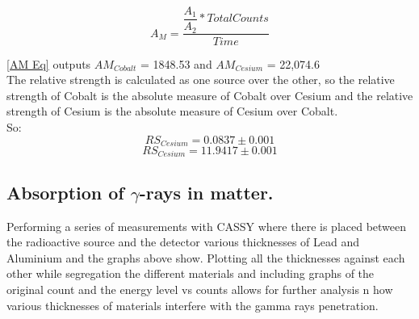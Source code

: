 \documentclass[12pt]{article}
\begin{document}
\begin{equation}
A_M = \dfrac{\dfrac{A_1}{A_2}* Total Counts}{Time}
\label{AM Eq}
\end{equation} 

\cref{AM Eq} outputs $AM_{Cobalt}$ = 1848.53 and $AM_{Cesium}$ = 22,074.6 \\

The relative strength is calculated as one source over the other, so the relative strength of Cobalt is the absolute measure of Cobalt over Cesium and the relative strength of Cesium is the absolute measure of Cesium over Cobalt.\\

So:
\begin{equation}
RS_{Cesium} = 0.0837 \pm0.001
\label{RSCO Eq}
\end{equation}
\begin{equation}
RS_{Cesium} = 11.9417 \pm0.001
\label{RSCE Eq}
\end{equation}

\subsection{Absorption of $\gamma$-rays in matter.}
\label{Absorption SubSection}

Performing a series of measurements with CASSY where there is placed between the radioactive source and the detector various thicknesses of Lead and Aluminium and the graphs above show. Plotting all the thicknesses against each other while segregation the different materials and including graphs of the original count and the energy level vs counts allows for further analysis n how various thicknesses of materials interfere with the gamma rays penetration.\\
\end{document}

